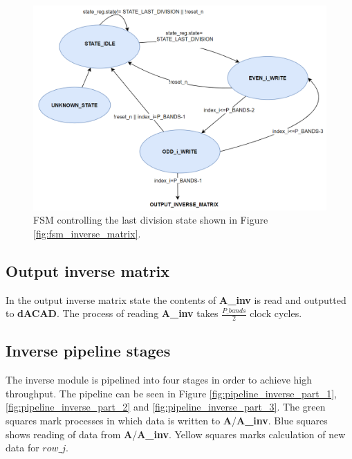 \begin{figure}[H]
\centering
   \includegraphics[scale=0.3]{images/inverse_hw/fsm_last_division.PNG}
  \caption{FSM controlling the last division state shown in Figure \ref{fig:fsm_inverse_matrix}.  } 
  \label{fig:fsm_last_division}
\end{figure}


\subsection{Output inverse matrix}
In the output inverse matrix state the contents of \textbf{A\_inv} is read and outputted to \textbf{dACAD}. The process of reading \textbf{A\_inv} takes $\frac{P\_bands}{2}$ clock cycles. 

\subsection{Inverse pipeline stages}
The inverse module is pipelined into four stages in order to achieve high throughput. The pipeline can be seen in Figure \ref{fig:pipeline_inverse_part_1}, \ref{fig:pipeline_inverse_part_2} and \ref{fig:pipeline_inverse_part_3}. The green squares mark processes in which data is written to \textbf{A}/\textbf{A\_inv}. Blue squares shows reading of data from \textbf{A}/\textbf{A\_inv}. Yellow squares marks calculation of new data for $row\_j$. 

